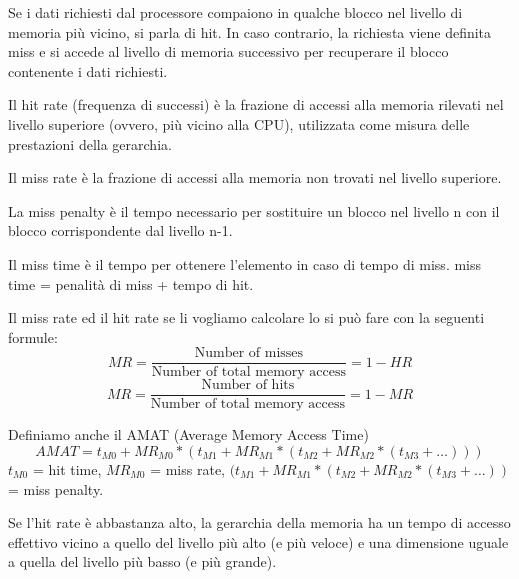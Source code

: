 \begin{definition}
Se i dati richiesti dal processore compaiono in qualche blocco nel livello di memoria più vicino, si parla di hit. In caso contrario, la richiesta viene definita miss e si accede al livello di memoria successivo per recuperare il blocco contenente i dati richiesti.
\end{definition}

\begin{definition}
    Il hit rate (frequenza di successi) è la frazione di accessi alla memoria rilevati nel livello superiore (ovvero, più vicino alla CPU), utilizzata come misura delle prestazioni della gerarchia.
\end{definition}

\begin{definition}
    Il miss rate è la frazione di accessi alla memoria non trovati nel livello superiore.
\end{definition}

\begin{definition}
    La miss penalty è il tempo necessario per sostituire un blocco nel livello n con il blocco corrispondente dal livello n-1.
\end{definition}

\begin{definition}
    Il miss time è il tempo per ottenere l'elemento in caso di tempo di miss. miss time = penalità di miss + tempo di hit.
\end{definition}

Il miss rate ed il hit rate se li vogliamo calcolare lo si può fare con la seguenti formule:
\begin{equation}
    MR = \frac{\text{Number of misses}}{\text{Number of total memory access}} = 1 - HR
\end{equation}
\begin{equation}
    MR = \frac{\text{Number of hits}}{\text{Number of total memory access}} = 1 - MR
\end{equation}

Definiamo anche il AMAT (Average Memory Access Time)
\begin{equation}
    AMAT = t_{M0} + MR_{M0} * (t_{M1} + MR_{M1} * (t_{M2} + MR_{M2} * (t_{M3} + \dots)))
\end{equation}
$t_{M0}$ = hit time, $MR_{M0}$ = miss rate, $(t_{M1} + MR_{M1} * (t_{M2} + MR_{M2} * (t_{M3} + \dots))$ = miss penalty.

\begin{observation}
Se l'hit rate è abbastanza alto, la gerarchia della memoria ha un tempo di accesso effettivo vicino a quello del livello più alto (e più veloce) e una dimensione uguale a quella del livello più basso (e più grande).
\end{observation}


